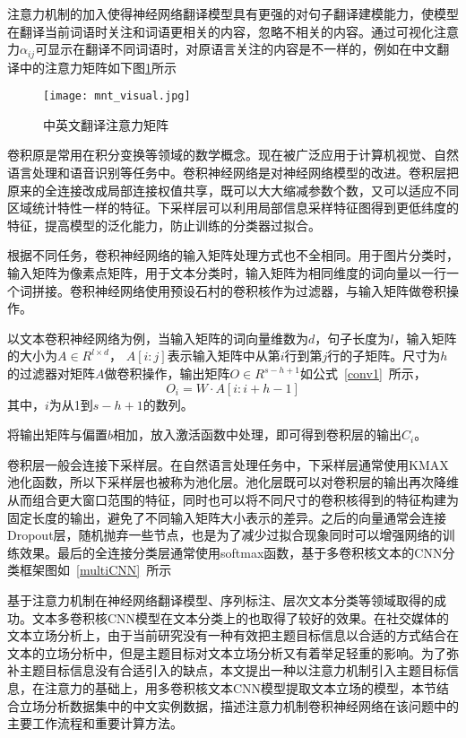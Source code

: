 注意力机制的加入使得神经网络翻译模型具有更强的对句子翻译建模能力，使模型在翻译当前词语时关注和词语更相关的内容，忽略不相关的内容。通过可视化注意力$\alpha_{ij}$可显示在翻译不同词语时，对原语言关注的内容是不一样的，例如在中文翻译中的注意力矩阵如下图\ref{english2china}所示
\begin{figure}[htbp]
	\centering
	\texttt{[image: mnt\_visual.jpg]}
	\caption[english2china1]{中英文翻译注意力矩阵}
	\label{english2china}
\end{figure}


卷积原是常用在积分变换等领域的数学概念。现在被广泛应用于计算机视觉、自然语言处理和语音识别等任务中。卷积神经网络是对神经网络模型的改进。卷积层把原来的全连接改成局部连接权值共享，既可以大大缩减参数个数，又可以适应不同区域统计特性一样的特征。下采样层可以利用局部信息采样特征图得到更低纬度的特征，提高模型的泛化能力，防止训练的分类器过拟合。

根据不同任务，卷积神经网络的输入矩阵处理方式也不全相同。用于图片分类时，输入矩阵为像素点矩阵，用于文本分类时，输入矩阵为相同维度的词向量以一行一个词拼接。卷积神经网络使用预设石村的卷积核作为过滤器，与输入矩阵做卷积操作。

以文本卷积神经网络为例，当输入矩阵的词向量维数为$d$，句子长度为$l$，输入矩阵的大小为$A\in R^{l\times d}$， $A[i:j]$表示输入矩阵中从第$i$行到第$j$行的子矩阵。尺寸为$h$的过滤器对矩阵$A$做卷积操作，输出矩阵$O\in R^{s-h+1}$如公式~\ref{conv1}~所示，
\begin{equation}\label{conv1}
O_i=W\cdot A[i:i+h-1]
\end{equation}
其中，$i$为从1到$s-h+1$的数列。

将输出矩阵与偏置$b$相加，放入激活函数中处理，即可得到卷积层的输出$C_i$。

卷积层一般会连接下采样层。在自然语言处理任务中，下采样层通常使用KMAX池化函数，所以下采样层也被称为池化层。池化层既可以对卷积层的输出再次降维从而组合更大窗口范围的特征，同时也可以将不同尺寸的卷积核得到的特征构建为固定长度的输出，避免了不同输入矩阵大小表示的差异。之后的向量通常会连接Dropout层，随机抛弃一些节点，也是为了减少过拟合现象同时可以增强网络的训练效果。最后的全连接分类层通常使用softmax函数，基于多卷积核文本的CNN分类框架图如~\ref{multiCNN}~所示

基于注意力机制在神经网络翻译模型、序列标注、层次文本分类等领域取得的成功。文本多卷积核CNN模型在文本分类上的也取得了较好的效果。在社交媒体的文本立场分析上，由于当前研究没有一种有效把主题目标信息以合适的方式结合在文本的立场分析中，但是主题目标对文本立场分析又有着举足轻重的影响。为了弥补主题目标信息没有合适引入的缺点，本文提出一种以注意力机制引入主题目标信息，在注意力的基础上，用多卷积核文本CNN模型提取文本立场的模型，本节结合立场分析数据集中的中文实例数据，描述注意力机制卷积神经网络在该问题中的主要工作流程和重要计算方法。

